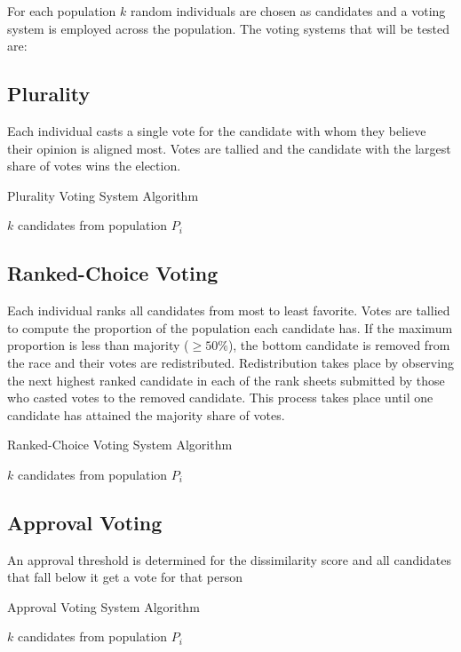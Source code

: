 
For each population $k$ random individuals are chosen as candidates and a voting system is employed across the population.
The voting systems that will be tested are:
\subsection{Plurality}
Each individual casts a single vote for the candidate with whom they believe their opinion is aligned most.
Votes are tallied and the candidate with the largest share of votes wins the election.
\begin{algorithm}[H]
\caption{Plurality Voting System Algorithm}\label{alg:plurality}
\begin{algorithmic}
\State \Choose $k$ candidates from population $P_i$
\end{algorithmic}
\end{algorithm}

\subsection{Ranked-Choice Voting}
Each individual ranks all candidates from most to least favorite.
Votes are tallied to compute the proportion of the population each candidate has.
If the maximum proportion is less than majority ($\geq 50\%$), the bottom candidate is removed from the race and their votes are redistributed.
Redistribution takes place by observing the next highest ranked candidate in each of the rank sheets submitted by those who casted votes
to the removed candidate. This process takes place until one candidate has attained the majority share of votes.
\begin{algorithm}[H]
\caption{Ranked-Choice Voting System Algorithm}\label{alg:ranked}
\begin{algorithmic}
\State \Choose $k$ candidates from population $P_i$
\end{algorithmic}
\end{algorithm}

\subsection{Approval Voting}
An approval threshold is determined for the dissimilarity score and all candidates that fall below it get a vote for that person
\begin{algorithm}[H]
\caption{Approval Voting System Algorithm}\label{alg:approval}
\begin{algorithmic}
\State \Choose $k$ candidates from population $P_i$
\end{algorithmic}
\end{algorithm}


